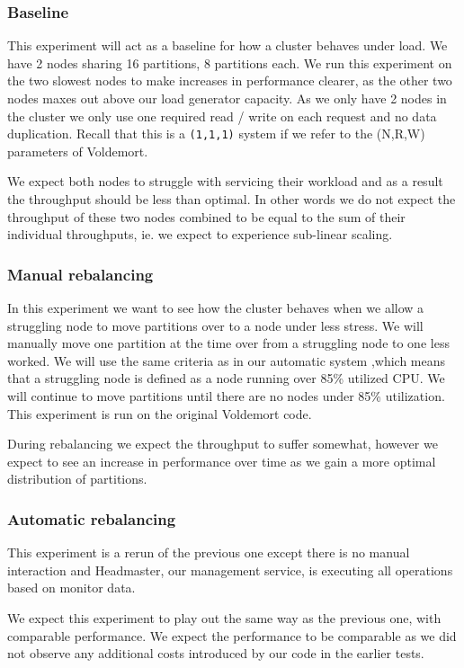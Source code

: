 \subsubsection{Baseline}
This experiment will act as a baseline for how a cluster behaves under load. We have 2 nodes sharing 16 partitions, 8 partitions each. We run this experiment on the two slowest nodes to make increases in performance clearer, as the other two nodes maxes out above our load generator capacity. As we only have 2 nodes in the cluster we only use one required read / write on each request and no data duplication. Recall that this is a \texttt{(1,1,1)} system if we refer to the (N,R,W) parameters of Voldemort.

We expect both nodes to struggle with servicing their workload and as a result the throughput should be less than optimal. In other words we do not expect the throughput of these two nodes combined to be equal to the sum of their individual throughputs, ie. we expect to experience sub-linear scaling. 

\subsubsection{Manual rebalancing}
In this experiment we want to see how the cluster behaves when we allow a struggling node to move partitions over to a node under less stress. We will manually move one partition at the time over from a struggling node to one less worked. We will use the same criteria as in our automatic system ,which means that a struggling node is defined as a node running over 85\% utilized CPU. We will continue to move partitions until there are no nodes under 85\% utilization. This experiment is run on the original Voldemort code. 

During rebalancing we expect the throughput to suffer somewhat, however we expect to see an increase in performance over time as we gain a more optimal distribution of partitions. 

\subsubsection{Automatic rebalancing}
This experiment is a rerun of the previous one except there is no manual interaction and Headmaster, our management service, is executing all operations based on monitor data.

We expect this experiment to play out the same way as the previous one, with comparable performance. We expect the performance to be comparable as we did not observe any additional costs introduced by our code in the earlier tests.

